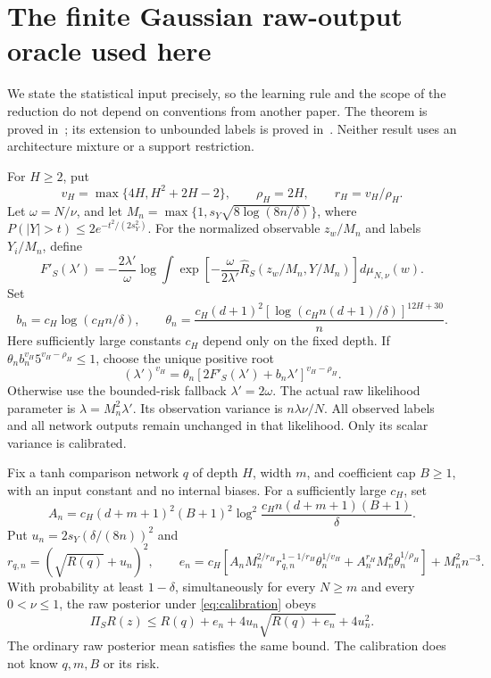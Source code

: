 \section{The finite Gaussian raw-output oracle used here}
\label{sec:statistical-interface}
We state the statistical input precisely, so the learning rule and the
scope of the reduction do not depend on conventions from another paper.
The theorem is proved in~\cite{gaussian}; its extension to unbounded
labels is proved in~\cite{tails}. Neither result uses an architecture
mixture or a support restriction.

For $H\ge2$, put
\[
 v_H=\max\{4H,H^2+2H-2\},\qquad \rho_H=2H,\qquad r_H=v_H/\rho_H.
\]
Let $\omega=N/\nu$, and let
$M_n=\max\{1,s_Y\sqrt{8\log(8n/\delta)}\}$, where
$P(|Y|>t)\le2e^{-t^2/(2s_Y^2)}$.
For the normalized observable $z_w/M_n$ and labels $Y_i/M_n$, define
\[
 F'_S(\lambda')=-\frac{2\lambda'}\omega
 \log\int\exp\left[-\frac\omega{2\lambda'}
       \widehat R_S(z_w/M_n,Y/M_n)\right]d\mu_{N,\nu}(w).
\]
Set
\[
 b_n=c_H\log(c_Hn/\delta),\qquad
 \theta_n=\frac{c_H(d+1)^2
       [\log(c_Hn(d+1)/\delta)]^{12H+30}}n.
\]
Here sufficiently large constants $c_H$ depend only on the fixed depth.
If $\theta_n b_n^{v_H}5^{v_H-\rho_H}\le1$, choose the unique positive
root
\begin{equation}
 (\lambda')^{v_H}=\theta_n
       [2F'_S(\lambda')+b_n\lambda']^{v_H-\rho_H}.
 \label{eq:calibration}
\end{equation}
Otherwise use the bounded-risk fallback $\lambda'=2\omega$.
The actual raw likelihood parameter is $\lambda=M_n^2\lambda'$.
Its observation variance is $n\lambda\nu/N$.
All observed labels and all network outputs remain unchanged in that
likelihood. Only its scalar variance is calibrated.

\begin{lemma}
\label{lem:gaussian-interface}
Fix a tanh comparison network $q$ of depth $H$, width $m$, and
coefficient cap $B\ge1$, with an input constant and no internal biases.
For a sufficiently large $c_H$, set
\[
 A_n=c_H(d+m+1)^2(B+1)^2
       \log^2\frac{c_Hn(d+m+1)(B+1)}\delta.
\]
Put $u_n=2s_Y(\delta/(8n))^2$ and
\[
 r_{q,n}=(\sqrt{R(q)}+u_n)^2,\qquad
 e_n=c_H\left[A_nM_n^{2/r_H}r_{q,n}^{1-1/r_H}\theta_n^{1/v_H}
       +A_n^{r_H}M_n^2\theta_n^{1/\rho_H}\right]+M_n^2n^{-3}.
\]
With probability at least $1-\delta$, simultaneously for every
$N\ge m$ and every $0<\nu\le1$, the raw posterior under
\eqref{eq:calibration} obeys
\begin{equation}
 \Pi_SR(z)\le R(q)+e_n+4u_n\sqrt{R(q)+e_n}+4u_n^2.
 \label{eq:gaussian-interface}
\end{equation}
The ordinary raw posterior mean satisfies the
same bound. The calibration does not know $q,m,B$ or its risk.
\end{lemma}


